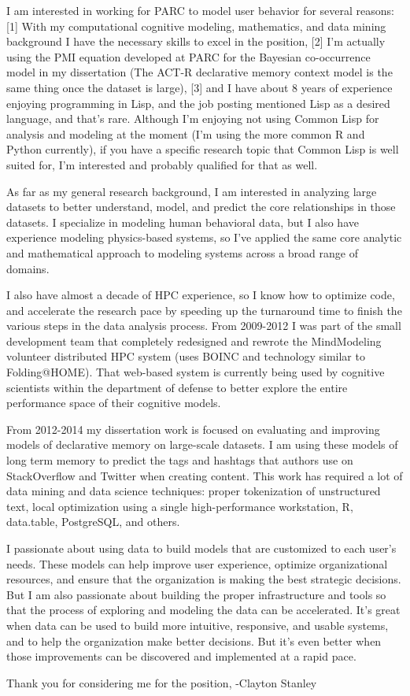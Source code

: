 \documentclass{article}
\begin{document}
I am interested in working for PARC to model user behavior for several reasons:
[1] With my computational cognitive modeling, mathematics, and data mining background I have the necessary skills to excel in the position,
[2] I'm actually using the PMI equation developed at PARC for the Bayesian co-occurrence model in my dissertation (The ACT-R declarative memory context model is the same thing once the dataset is large),
[3] and I have about 8 years of experience enjoying programming in Lisp, and the job posting mentioned Lisp as a desired language, and that's rare.
Although I'm enjoying not using Common Lisp for analysis and modeling at the moment (I'm using the more common R and Python currently), if you have a specific research topic that Common Lisp is well suited for,
I'm interested and probably qualified for that as well.

As far as my general research background, I am interested in analyzing large datasets to better understand, model, and predict the core relationships in those datasets.
I specialize in modeling human behavioral data, but I also have experience modeling physics-based systems,
so I've applied the same core analytic and mathematical approach to modeling systems across a broad range of domains.

I also have almost a decade of HPC experience, so I know how to optimize code, and accelerate the research pace by speeding up the turnaround time to finish the various steps in the data analysis process. 
From 2009-2012 I was part of the small development team that completely redesigned and rewrote the MindModeling volunteer distributed HPC system (uses BOINC and technology similar to Folding@HOME).
That web-based system is currently being used by cognitive scientists within the department of defense to better explore the entire performance space of their cognitive models.

From 2012-2014 my dissertation work is focused on evaluating and improving models of declarative memory on large-scale datasets.
I am using these models of long term memory to predict the tags and hashtags that authors use on StackOverflow and Twitter when creating content.
This work has required a lot of data mining and data science techniques: proper tokenization of unstructured text, local optimization using a single high-performance workstation, R, data.table, PostgreSQL, and others.

I passionate about using data to build models that are customized to each user's needs.
These models can help improve user experience, optimize organizational resources, and ensure that the organization is making the best strategic decisions.
But I am also passionate about building the proper infrastructure and tools so that the process of exploring and modeling the data can be accelerated.
It's great when data can be used to build more intuitive, responsive, and usable systems, and to help the organization make better decisions.
But it's even better when those improvements can be discovered and implemented at a rapid pace.

Thank you for considering me for the position,
-Clayton Stanley
\end{document}
